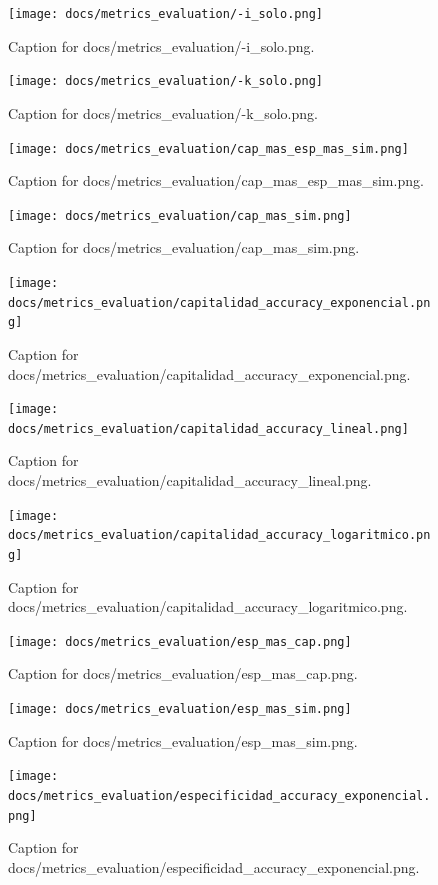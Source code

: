 \documentclass{article}
\begin{document}
\begin{figure}[h] \centering \texttt{[image: docs/metrics\_evaluation/-i\_solo.png]} \caption{Caption for docs/metrics_evaluation/-i_solo.png.} \end{figure}
\begin{figure}[h] \centering \texttt{[image: docs/metrics\_evaluation/-k\_solo.png]} \caption{Caption for docs/metrics_evaluation/-k_solo.png.} \end{figure}
\begin{figure}[h] \centering \texttt{[image: docs/metrics\_evaluation/cap\_mas\_esp\_mas\_sim.png]} \caption{Caption for docs/metrics_evaluation/cap_mas_esp_mas_sim.png.} \end{figure}
\begin{figure}[h] \centering \texttt{[image: docs/metrics\_evaluation/cap\_mas\_sim.png]} \caption{Caption for docs/metrics_evaluation/cap_mas_sim.png.} \end{figure}
\begin{figure}[h] \centering \texttt{[image: docs/metrics\_evaluation/capitalidad\_accuracy\_exponencial.png]} \caption{Caption for docs/metrics_evaluation/capitalidad_accuracy_exponencial.png.} \end{figure}
\begin{figure}[h] \centering \texttt{[image: docs/metrics\_evaluation/capitalidad\_accuracy\_lineal.png]} \caption{Caption for docs/metrics_evaluation/capitalidad_accuracy_lineal.png.} \end{figure}
\begin{figure}[h] \centering \texttt{[image: docs/metrics\_evaluation/capitalidad\_accuracy\_logaritmico.png]} \caption{Caption for docs/metrics_evaluation/capitalidad_accuracy_logaritmico.png.} \end{figure}
\begin{figure}[h] \centering \texttt{[image: docs/metrics\_evaluation/esp\_mas\_cap.png]} \caption{Caption for docs/metrics_evaluation/esp_mas_cap.png.} \end{figure}
\begin{figure}[h] \centering \texttt{[image: docs/metrics\_evaluation/esp\_mas\_sim.png]} \caption{Caption for docs/metrics_evaluation/esp_mas_sim.png.} \end{figure}
\begin{figure}[h] \centering \texttt{[image: docs/metrics\_evaluation/especificidad\_accuracy\_exponencial.png]} \caption{Caption for docs/metrics_evaluation/especificidad_accuracy_exponencial.png.} \end{figure}
\end{document}
